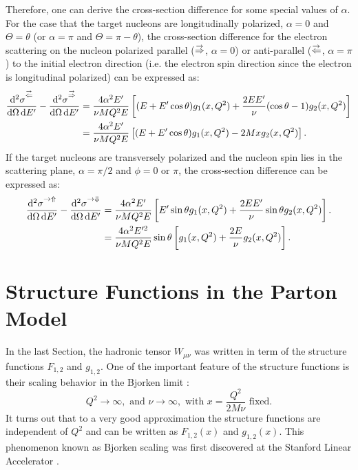 Therefore, one can derive the cross-section difference for some special values of $\alpha$. For the case that the target nucleons are longitudinally polarized, $\alpha=0$ and $\Theta=\theta$ (or $\alpha=\pi$ and $\Theta=\pi-\theta$), the cross-section difference for the electron scattering on the nucleon polarized parallel ($\buildrel\rightarrow\over\Rightarrow$, $\alpha=0$) or anti-parallel ($\buildrel\rightarrow\over\Leftarrow$, $\alpha=\pi$) to the initial electron direction (i.e. the electron spin direction since the electron is longitudinal polarized) can be expressed as:
\begin{align}
\frac{\dd[2]{\sigma}^{\buildrel\rightarrow\over\Leftarrow}}{\dd{\Omega}\dd{E'}}-\frac{\dd[2]{\sigma}^{\buildrel\rightarrow\over\Rightarrow}}{\dd{\Omega}\dd{E'}} & = \frac{4\alpha^2E'}{\nu MQ^2E}\left[(E+E'\cos\theta)g_1(x,Q^2)+\frac{2EE'}{\nu}(\cos\theta-1)g_2(x,Q^2)\right] \notag \\ \label{C2S2E25}
& =\frac{4\alpha^2E'}{\nu MQ^2E}\left[(E+E'\cos\theta)g_1(x,Q^2)-2Mxg_2(x,Q^2)\right].
\end{align}
If the target nucleons are transversely polarized and the nucleon spin lies in the scattering plane, $\alpha=\pi/2$ and $\phi=0$ or $\pi$, the cross-section difference can be expressed as:
\begin{align}
\frac{\dd[2]{\sigma}^{\rightarrow\Uparrow}}{\dd{\Omega}\dd{E'}}-\frac{\dd[2]{\sigma}^{\rightarrow\Downarrow}}{\dd{\Omega}\dd{E'}} & = \frac{4\alpha^2E'}{\nu MQ^2E}\left[E'\sin\theta g_1(x,Q^2)+\frac{2EE'}{\nu}\sin\theta g_2(x,Q^2)\right]. \notag \\ \label{C2S2E26}
& = \frac{4\alpha^2E'^2}{\nu MQ^2E}\sin\theta\left[g_1(x,Q^2)+\frac{2E}{\nu}g_2(x,Q^2)\right].
\end{align}

\section{Structure Functions in the Parton Model}
\label{C2S3}

In the last Section, the hadronic tensor $W_{\mu\nu}$ was written in term of the structure functions $F_{1,2}$ and $g_{1,2}$. One of the important feature of the structure functions is their scaling behavior in the Bjorken limit \cite{Bjorken1969}:
\begin{equation} \label{C2S3E1}
Q^2\to\infty, \text{ and } \nu\to\infty, \text{ with } x=\frac{Q^2}{2M\nu} \text{ fixed}.
\end{equation}
It turns out that to a very good approximation the structure functions are independent of $Q^2$ and can be written as $F_{1,2}(x)$ and $g_{1,2}(x)$. This phenomenon known as Bjorken scaling was first discovered at the Stanford Linear Accelerator \cite{Kendall1991}.

